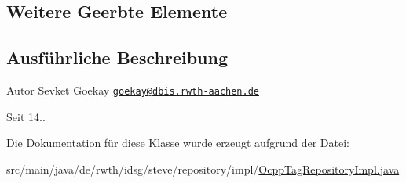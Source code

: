 \subsection*{Weitere Geerbte Elemente}


\subsection{Ausführliche Beschreibung}
\begin{DoxyAuthor}{Autor}
Sevket Goekay \href{mailto:goekay@dbis.rwth-aachen.de}{\tt goekay@dbis.\+rwth-\/aachen.\+de} 
\end{DoxyAuthor}
\begin{DoxySince}{Seit}
14.. 
\end{DoxySince}


Die Dokumentation für diese Klasse wurde erzeugt aufgrund der Datei\+:\begin{DoxyCompactItemize}
\item 
src/main/java/de/rwth/idsg/steve/repository/impl/\hyperlink{_ocpp_tag_repository_impl_8java}{Ocpp\+Tag\+Repository\+Impl.\+java}\end{DoxyCompactItemize}
